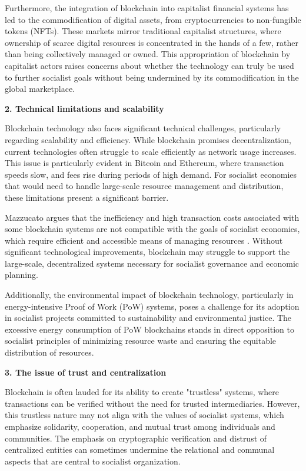 \begin{refsection}
Furthermore, the integration of blockchain into capitalist financial systems has led to the commodification of digital assets, from cryptocurrencies to non-fungible tokens (NFTs). These markets mirror traditional capitalist structures, where ownership of scarce digital resources is concentrated in the hands of a few, rather than being collectively managed or owned. This appropriation of blockchain by capitalist actors raises concerns about whether the technology can truly be used to further socialist goals without being undermined by its commodification in the global marketplace.

\textbf{2. Technical limitations and scalability}

Blockchain technology also faces significant technical challenges, particularly regarding scalability and efficiency. While blockchain promises decentralization, current technologies often struggle to scale efficiently as network usage increases. This issue is particularly evident in Bitcoin and Ethereum, where transaction speeds slow, and fees rise during periods of high demand. For socialist economies that would need to handle large-scale resource management and distribution, these limitations present a significant barrier.

Mazzucato argues that the inefficiency and high transaction costs associated with some blockchain systems are not compatible with the goals of socialist economies, which require efficient and accessible means of managing resources \cite[pp.~89-90]{mazzucato2023}. Without significant technological improvements, blockchain may struggle to support the large-scale, decentralized systems necessary for socialist governance and economic planning.

Additionally, the environmental impact of blockchain technology, particularly in energy-intensive Proof of Work (PoW) systems, poses a challenge for its adoption in socialist projects committed to sustainability and environmental justice. The excessive energy consumption of PoW blockchains stands in direct opposition to socialist principles of minimizing resource waste and ensuring the equitable distribution of resources.

\textbf{3. The issue of trust and centralization}

Blockchain is often lauded for its ability to create "trustless" systems, where transactions can be verified without the need for trusted intermediaries. However, this trustless nature may not align with the values of socialist systems, which emphasize solidarity, cooperation, and mutual trust among individuals and communities. The emphasis on cryptographic verification and distrust of centralized entities can sometimes undermine the relational and communal aspects that are central to socialist organization.


\end{refsection}
